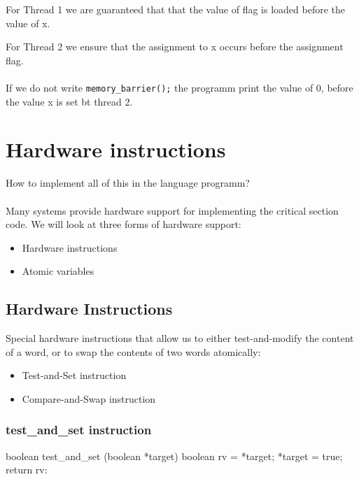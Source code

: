 For Thread 1 we are guaranteed that that the value of flag
is loaded before the value of x.

For Thread 2 we ensure that the assignment to x occurs
before the assignment flag.

\paragraph{}
If we do not write \verb|memory_barrier();| the programm print the value of 0, before the value x is set bt thread 2.

\newpage
\section{Hardware instructions}

How to implement all of this in the language programm?

\paragraph{}
Many systems provide hardware support for implementing the critical section code.
We will look at three forms of hardware support:
\begin{itemize}
    \item Hardware instructions
    \item Atomic variables
\end{itemize}

\subsection{Hardware Instructions}
Special hardware instructions that allow us to either
test-and-modify the content of a word, or to swap the
contents of two words atomically: 

\begin{itemize}
    \item[] Test-and-Set instruction
    \item[] Compare-and-Swap instruction
\end{itemize}


\subsubsection{test\_and\_set instruction}

\begin{codeInC}
boolean test_and_set (boolean *target){
    boolean rv = *target;
    *target = true;
    return rv:
}
\end{codeInC}

